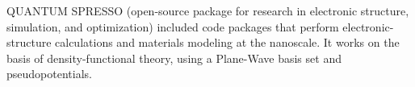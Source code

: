 QUANTUM SPRESSO (open-source package for research in electronic structure, simulation, and optimization) included code packages that perform electronic-structure calculations and materials modeling at the nanoscale. It works on the basis of density-functional theory, using a Plane-Wave basis set and pseudopotentials.